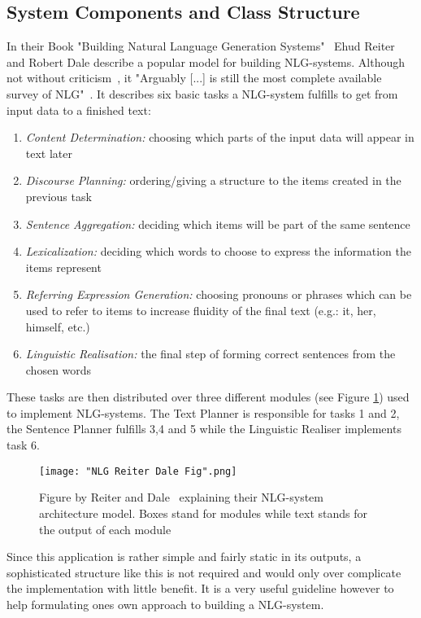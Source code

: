 \documentclass[sigconf,obeyspaces]{acmart}
\begin{document}
\subsection{System Components and Class Structure}
In their Book "Building Natural Language Generation Systems"~\cite{reiter_dale_2000} Ehud Reiter and Robert Dale describe a popular model for building NLG-systems. Although not without criticism~\cite[3\psqq]{mellish_scott_cahill_paiva_evans_reape_2006}, it "Arguably [...] is still the most complete available survey of NLG"~\cite[5]{gatt_Krahmer}. It describes six basic tasks a NLG-system fulfills to get from input data to a finished text:
\begin{enumerate}[label=\arabic*.]
    \item \emph{Content Determination:} choosing which parts of the input data will appear in text later
    \item \emph{Discourse Planning:} ordering/giving a structure to the items created in the previous task
    \item \emph{Sentence Aggregation:} deciding which items will be part of the same sentence
    \item \emph{Lexicalization:} deciding which words to choose to express the information the items represent
    \item \emph{Referring Expression Generation:} choosing pronouns or phrases which can be used to refer to items to increase fluidity of the final text (e.g.: it, her, himself, etc.) 
    \item \emph{Linguistic Realisation:} the final step of forming correct sentences from the chosen words
\end{enumerate}
These tasks are then distributed over three different modules (see Figure \ref{modules_fig}) used to implement NLG-systems. The Text Planner is responsible for tasks 1 and 2, the Sentence Planner fulfills 3,4 and 5 while the Linguistic Realiser implements task 6.

\begin{figure}[h]
    \centering
    \texttt{[image: "NLG Reiter Dale Fig".png]}
    \caption{Figure by Reiter and Dale~\cite{reiter_dale} explaining their NLG-system architecture model. Boxes stand for modules while text stands for the output of each module}
    \label{modules_fig}
\end{figure}
Since this application is rather simple and fairly static in its outputs, a sophisticated structure like this is not required and would only over complicate the implementation with little benefit. It is a very useful guideline however to help formulating ones own approach to building a NLG-system.
\end{document}
